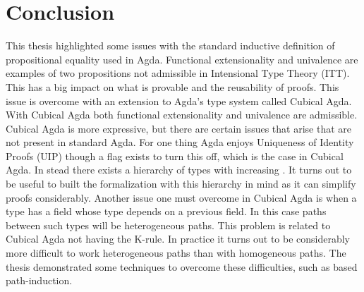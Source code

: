 \chapter{Conclusion}
This thesis highlighted some issues with the standard inductive
definition of propositional equality used in Agda. Functional
extensionality and univalence are examples of two propositions not
admissible in Intensional Type Theory (ITT). This has a big impact on
what is provable and the reusability of proofs. This issue is overcome
with an extension to Agda's type system called Cubical Agda. With
Cubical Agda both functional extensionality and univalence are
admissible. Cubical Agda is more expressive, but there are certain
issues that arise that are not present in standard Agda. For one thing
Agda enjoys Uniqueness of Identity Proofs (UIP) though a flag exists
to turn this off, which is the case in Cubical Agda. In stead
there exists a hierarchy of types with increasing .  It turns out to be useful to built the
formalization with this hierarchy in mind as it can simplify proofs
considerably. Another issue one must overcome in Cubical Agda is when
a type has a field whose type depends on a previous field. In this
case paths between such types will be heterogeneous paths. This
problem is related to Cubical Agda not having the K-rule. In practice
it turns out to be considerably more difficult to work heterogeneous
paths than with homogeneous paths. The thesis demonstrated some
techniques to overcome these difficulties, such as based
path-induction.

